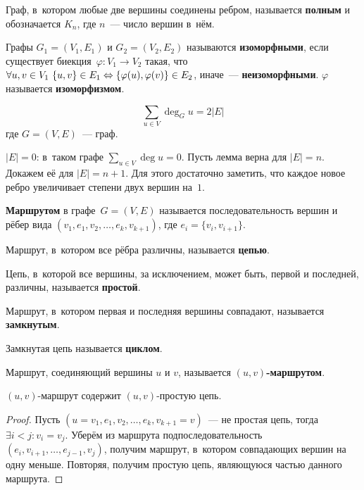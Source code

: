 Граф, в~котором любые две вершины соединены ребром, называется \textbf{полным} и обозначается $K_n$, где $n$~--- число вершин в~нём.

Графы $G_1 = (V_1, E_1)$ и $G_2 = (V_2, E_2)$ называются \textbf{изоморфными}, если существует биекция~$\varphi \colon V_1 \to V_2$ такая, что
$\forall u, v \in V_1 \ \allowbreak \{ u, v \} \in E_1 \opbr\Leftrightarrow \{ \varphi(u), \varphi(v) \} \in E_2$, иначе~--- \textbf{неизоморфными}.
$\varphi$ называется \textbf{изоморфизмом}.

\begin{lemma}[о~рукопожатиях]
\begin{equation*}
\sum_{u \in V} \deg_G u = 2|E|
\end{equation*}
где $G = (V, E)$~--- граф.
\end{lemma}
\begin{proofmathind}
	\indbase $|E| = 0$: в~таком графе $\displaystyle \sum_{u \in V} \deg u = 0$.
	\indstep Пусть лемма верна для $|E| = n$.
	Докажем её для $|E| = n + 1$.
	Для этого достаточно заметить, что каждое новое ребро увеличивает степени двух вершин на~$1$. \indend
\end{proofmathind}

 \textbf{Маршрутом} в графе~$G = (V, E)$ называется последовательность вершин и рёбер вида\newline
$(v_1, e_1, v_2, \ldots, e_k, v_{k+1})$, где $e_i = \{ v_i, v_{i+1} \}$.

 Маршрут, в~котором все рёбра различны, называется \textbf{цепью}.

Цепь, в~которой все вершины, за исключением, может быть, первой и последней, различны, называется \textbf{простой}.

Маршрут, в~котором первая и последняя вершины совпадают, называется \textbf{замкнутым}.

 Замкнутая цепь называется \textbf{циклом}.

Маршрут, соединяющий вершины $u$ и $v$, называется \textbf{$(u, v)$-маршрутом}.

\begin{lemma}
$(u, v)$-маршрут содержит $(u, v)$-простую цепь.
\end{lemma}
\begin{proof}
Пусть $(u = v_1, e_1, v_2, \ldots, e_k, v_{k+1} = v)$~--- не простая цепь, тогда $\exists i < j \colon v_i = v_j$.
Уберём из маршрута подпоследовательность $(e_i, v_{i+1}, \ldots, e_{j-1}, v_j)$, получим маршрут, в~котором совпадающих вершин на одну меньше.
Повторяя, получим простую цепь, являющуюся частью данного маршрута.
\end{proof}

